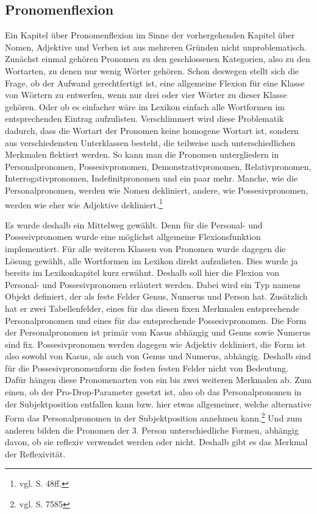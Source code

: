 \documentclass[fontsize=12pt,abstract=on,titlepage,bibliography=totoc,ngerman,listof=totoc]{scrreprt}
\begin{document}
\subsection{Pronomenflexion}
\label{subsec:pronomen}
Ein Kapitel über Pronomenflexion im Sinne der vorhergehenden Kapitel über Nomen, Adjektive und Verben ist aus mehreren Gründen nicht unproblematisch. Zunächst einmal gehören Pronomen zu den geschlossenen Kategorien, also zu den Wortarten, zu denen nur wenig Wörter gehören. Schon deswegen stellt sich die Frage, ob der Aufwand gerechtfertigt ist, eine allgemeine Flexion für eine Klasse von Wörtern zu entwerfen, wenn nur drei oder vier Wörter zu dieser Klasse gehören. Oder ob es einfacher wäre im Lexikon einfach alle Wortformen im entsprechenden Eintrag aufzulisten. Verschlimmert wird diese Problematik dadurch, dass die Wortart der Pronomen keine homogene Wortart ist, sondern aus verschiedensten Unterklassen besteht, die teilweise nach unterschiedlichen Merkmalen flektiert werden. So kann man die Pronomen untergliedern in Personalpronomen, Possesivpronomen, Demonstrativpronomen, Relativpronomen, Interrogativpronomen, Indefinitpronomen und ein paar mehr. Manche, wie die Personalpronomen, werden wie Nomen dekliniert, andere, wie Possesivpronomen, werden wie eher wie Adjektive dekliniert.\footnote{vgl. \cite{BAYER-LINDAUER1994} S. 48ff.} \par
Es wurde deshalb ein Mittelweg gewählt. Denn für die Personal- und Possesivpronomen wurde eine möglichst allgemeine Flexionsfunktion implementiert. Für alle weiteren Klassen von Pronomen wurde dagegen die Lösung gewählt, alle Wortformen im Lexikon direkt aufzulisten. Dies wurde ja bereits im Lexikonkapitel kurz erwähnt. Deshalb soll hier die Flexion von Personal- und Possesivpronomen erläutert werden. Dabei wird ein Typ namens Objekt definiert, der als feste Felder Genus, Numerus und Person hat. Zusätzlich hat er zwei Tabellenfelder, eines für das diesen fixen Merkmalen entsprechende Personalpronomen und eines für das entsprechende Possesivpronomen. Die Form der Personalpronomen ist primär vom Kasus abhängig und Genus sowie Numerus sind fix. Possesivpronomen werden dagegen wie Adjektiv dekliniert, die Form ist also sowohl von Kasus, als auch von Genus und Numerus, abhängig. Deshalb sind für die Possesivpronomenform die festen festen Felder nicht von Bedeutung. Dafür hängen diese Pronomenarten von ein bis zwei weiteren Merkmalen ab. Zum einen, ob der Pro-Drop-Parameter gesetzt ist, also ob das Personalpronomen in der Subjektposition entfallen kann bzw. hier etwas allgemeiner, welche alternative Form das Personalpronomen in der Subjektposition annehmen kann.\footnote{vgl. \cite{METZLER2004} S. 7585} Und zum anderen bilden die Pronomen der 3. Person unterschiedliche Formen, abhängig davon, ob sie reflexiv verwendet werden oder nicht. Deshalb gibt es das Merkmal der Reflexivität. \par
\end{document}

